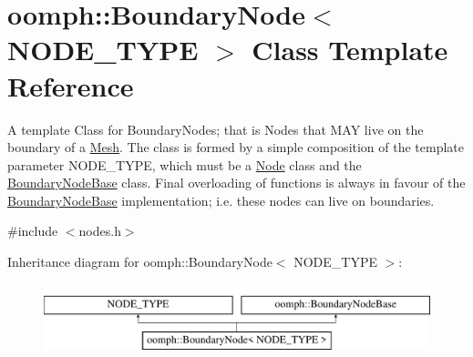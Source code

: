 \hypertarget{classoomph_1_1BoundaryNode}{}\section{oomph\+:\+:Boundary\+Node$<$ N\+O\+D\+E\+\_\+\+T\+Y\+PE $>$ Class Template Reference}
\label{classoomph_1_1BoundaryNode}


A template Class for Boundary\+Nodes; that is Nodes that M\+AY live on the boundary of a \hyperlink{classoomph_1_1Mesh}{Mesh}. The class is formed by a simple composition of the template parameter N\+O\+D\+E\+\_\+\+T\+Y\+PE, which must be a \hyperlink{classoomph_1_1Node}{Node} class and the \hyperlink{classoomph_1_1BoundaryNodeBase}{Boundary\+Node\+Base} class. Final overloading of functions is always in favour of the \hyperlink{classoomph_1_1BoundaryNodeBase}{Boundary\+Node\+Base} implementation; i.\+e. these nodes can live on boundaries.  




{\ttfamily \#include $<$nodes.\+h$>$}

Inheritance diagram for oomph\+:\+:Boundary\+Node$<$ N\+O\+D\+E\+\_\+\+T\+Y\+PE $>$\+:\begin{figure}[H]
\begin{center}
\leavevmode
\includegraphics[height=2.000000cm]{classoomph_1_1BoundaryNode}
\end{center}
\end{figure}
